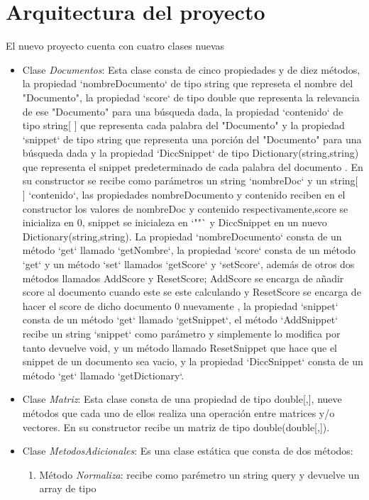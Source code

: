 \documentclass{article}
\begin{document}
\section{Arquitectura del proyecto}
El nuevo proyecto cuenta con cuatro clases nuevas
\begin{itemize}
    \item Clase \textit{Documentos}: Esta clase consta de cinco propiedades y de diez métodos, la propiedad `nombreDocumento` de tipo string que represeta el nombre del "Documento",
    la propiedad `score` de tipo double que representa la relevancia de ese "Documento" para una búsqueda dada, la propiedad `contenido` de tipo string[ ] que representa cada palabra
     del "Documento" y la propiedad `snippet` de tipo string que representa una porción del "Documento" para una búsqueda dada y la propiedad `DiccSnippet` de tipo Dictionary(string,string)
      que representa el snippet predeterminado de cada palabra del documento . En su constructor se recibe como parámetros un string `nombreDoc` y un string[ ] `contenido`, las propiedades
       nombreDocumento y contenido reciben en el constructor los valores de nombreDoc y contenido respectivamente,score se inicializa en 0, snippet se inicialeza en `""` y DiccSnippet en un 
       nuevo Dictionary(string,string).
    La propiedad `nombreDocumento` consta de un método `get` llamado `getNombre`, la propiedad `score` consta de un método `get` y un método `set` llamados `getScore` y `setScore`, además de 
    otros dos métodos llamados AddScore y ResetScore;
    AddScore se encarga de añadir score al documento cuando este se este calculando y ResetScore se encarga de hacer el score de dicho documento 0 nuevamente 
    , la propiedad `snippet` consta de un método `get` llamado `getSnippet`, el método `AddSnippet` recibe un string `snippet` como parámetro y simplemente lo modifica por tanto devuelve void, 
     y un método llamado ResetSnippet que hace que el snippet de un documento sea vacio, y la propiedad `DiccSnippet` consta de un método `get` llamado `getDictionary`.
    \item Clase \textit{Matriz}: Esta clase consta de una propiedad de tipo double[,], nueve métodos que cada uno 
    de ellos realiza una operación entre matrices y/o vectores. En su constructor recibe un matriz de tipo
    double(double[,]).
    \item Clase \textit{MetodosAdicionales}: Es una clase estática que consta de dos métodos:
    \begin{enumerate}
        \item Método \textit{Normaliza}: recibe como parémetro un string query y devuelve un array de tipo 

\end{enumerate}
\end{itemize}
\end{document}
